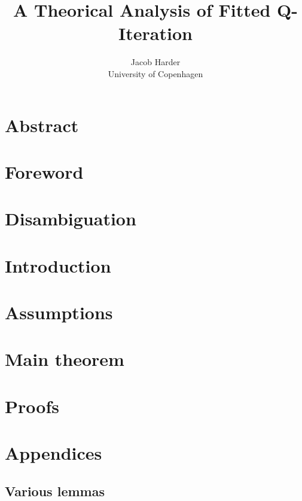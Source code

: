 \documentclass{article}
\title{A Theorical Analysis of Fitted Q-Iteration}
\author{Jacob Harder \\ University of Copenhagen}
\begin{document}
\maketitle

\section{Abstract}

\section{Foreword}


\section{Disambiguation}


\section{Introduction}


\section{Assumptions}


\section{Main theorem}


\section{Proofs}






\section{Appendices}
\subsection{Various lemmas}


\end{document}
